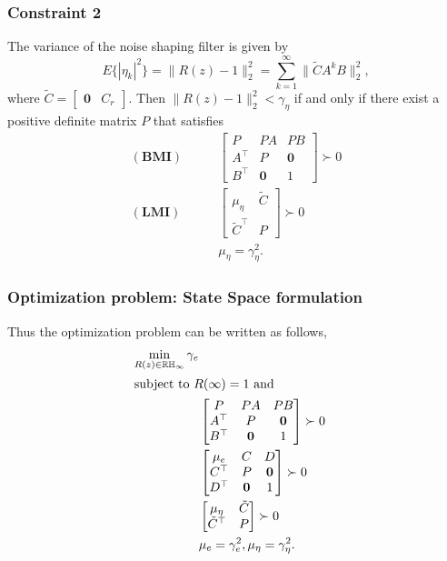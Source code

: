 \documentclass[a4paper]{article}
\begin{document}
\subsubsection{Constraint 2}
 The variance of the noise shaping filter is given by
 \begin{equation}
	E\{|\eta_{k}|^{2}\} = \|R(z)-1 \|_{2}^{2} = \sum_{k = 1}^{\infty} \|\tilde{C} A^{k} B\|_{2}^{2},
 \end{equation}
 where  $\tilde{C} = \begin{bmatrix}
	\mathbf{0} & C_r
 \end{bmatrix}$. Then $\|R(z)-1 \|_{2}^{2} < \gamma_{\eta}$ if and only if there exist a  positive definite matrix $P$ that satisfies
\begin{align}
	 \mathbf{(BMI)} \qquad &\begin{bmatrix}
		P & PA & PB \\
		A^{\top} & P & \mathbf{0} \\
		B^{\top} & \mathbf{0} & 1
	\end{bmatrix} \succ 0 \\
	\mathbf{(LMI)} \qquad &\begin{bmatrix}
		\mu_{\eta} & \tilde{C} \\
		\tilde{C}^{\top} & P 
	\end{bmatrix} \succ 0 \\
&\mu_{\eta} = \gamma_{\eta}^{2}.
\end{align}

\subsubsection{Optimization problem: State Space formulation}
Thus the optimization problem can be written as follows, 
\begin{align}	
	\min_{R(z) \in \mathbb{RH}_{\infty}}\gamma_{e} \\
	\intertext{subject to $R(\infty) = 1$ and}
	 &\begin{bmatrix}
		P & PA & PB \\
		A^{\top} & P & \mathbf{0} \\
		B^{\top} & \mathbf{0} & 1
	\end{bmatrix} \succ 0  \label{eq:bmi1}\\
	\qquad &\begin{bmatrix}
		\mu_{e} & C & D \\
		C^{\top} & P & \mathbf{0} \\
		D^{\top} & \mathbf{0} & 1
	\end{bmatrix} \succ 0 \label{eq:lmi1}\\	
	&\begin{bmatrix}
		\mu_{\eta} & \tilde{C} \\
		\tilde{C}^{\top} & P 
	\end{bmatrix} \succ 0 \label{eq:lmi2}\\
&\mu_{e} = \gamma_{e}^{2} , \mu_{\eta} = \gamma_{\eta}^{2}. \label{eq:lmi3}
\end{align}
\end{document}
